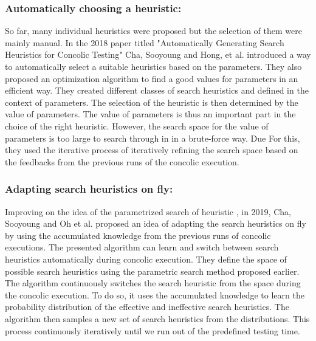 \documentclass[	runningheads,
				a4paper]{llncs}
\begin{document}
\subsubsection{Automatically choosing a heuristic:}
So far, many individual heuristics were proposed but the selection of them were mainly manual. In the 2018 paper titled "Automatically Generating Search Heuristics for Concolic Testing" \cite{cha2018automatically} Cha, Sooyoung and Hong, et al. introduced a way to automatically select a suitable heuristics based on the parameters. They also proposed an optimization algorithm to find a good values for parameters in an efficient way. They created different classes of search heuristics and defined in the context of parameters. The selection of the heuristic is then determined by the value of parameters. The value of parameters is thus an important part in the choice of the right heuristic. However, the search space for the value of parameters is too large to search through in in a brute-force way. Due For this, they used the iterative process of iteratively refining the search space based on the feedbacks from the previous runs of the concolic execution. 

\subsubsection{Adapting search heuristics on fly:}
Improving on the idea of the parametrized search of heuristic \cite{cha2018automatically}, in 2019, Cha, Sooyoung and Oh et al. proposed an idea \cite{adapt2019heuristic} of adapting the search heuristics on fly by using the accumulated knowledge from the previous runs of concolic executions. The presented algorithm can learn and switch between search heuristics automatically during concolic execution. They define the space of possible search heuristics using the parametric search method \cite{adapt2019heuristic} proposed earlier. The algorithm continuously switches the search heuristic from the space during the concolic execution. To do so, it uses the accumulated knowledge to learn the probability distribution of the effective and ineffective search heuristics. The algorithm then samples a new set of search heuristics from the distributions. This process continuously iteratively until we run out of the predefined testing time.
\end{document}
